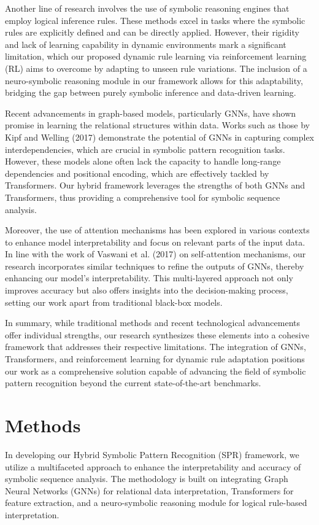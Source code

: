 \documentclass{article}
\begin{document}
Another line of research involves the use of symbolic reasoning engines that employ logical inference rules. These methods excel in tasks where the symbolic rules are explicitly defined and can be directly applied. However, their rigidity and lack of learning capability in dynamic environments mark a significant limitation, which our proposed dynamic rule learning via reinforcement learning (RL) aims to overcome by adapting to unseen rule variations. The inclusion of a neuro-symbolic reasoning module in our framework allows for this adaptability, bridging the gap between purely symbolic inference and data-driven learning.

Recent advancements in graph-based models, particularly GNNs, have shown promise in learning the relational structures within data. Works such as those by Kipf and Welling (2017) demonstrate the potential of GNNs in capturing complex interdependencies, which are crucial in symbolic pattern recognition tasks. However, these models alone often lack the capacity to handle long-range dependencies and positional encoding, which are effectively tackled by Transformers. Our hybrid framework leverages the strengths of both GNNs and Transformers, thus providing a comprehensive tool for symbolic sequence analysis.

Moreover, the use of attention mechanisms has been explored in various contexts to enhance model interpretability and focus on relevant parts of the input data. In line with the work of Vaswani et al. (2017) on self-attention mechanisms, our research incorporates similar techniques to refine the outputs of GNNs, thereby enhancing our model's interpretability. This multi-layered approach not only improves accuracy but also offers insights into the decision-making process, setting our work apart from traditional black-box models.

In summary, while traditional methods and recent technological advancements offer individual strengths, our research synthesizes these elements into a cohesive framework that addresses their respective limitations. The integration of GNNs, Transformers, and reinforcement learning for dynamic rule adaptation positions our work as a comprehensive solution capable of advancing the field of symbolic pattern recognition beyond the current state-of-the-art benchmarks.

\section{Methods}
In developing our Hybrid Symbolic Pattern Recognition (SPR) framework, we utilize a multifaceted approach to enhance the interpretability and accuracy of symbolic sequence analysis. The methodology is built on integrating Graph Neural Networks (GNNs) for relational data interpretation, Transformers for feature extraction, and a neuro-symbolic reasoning module for logical rule-based interpretation.
\end{document}
